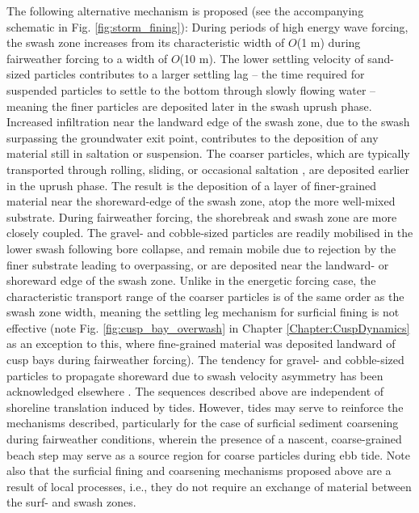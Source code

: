 The following alternative mechanism is proposed (see the accompanying schematic in Fig. \ref{fig:storm_fining}): During periods of high energy wave forcing, the swash zone increases from its characteristic width of $O$(1 m) during fairweather forcing to a width of $O$(10 m). The lower settling velocity of sand-sized particles contributes to a larger settling lag -- the time required for suspended particles to settle to the bottom through slowly flowing water \citep{Masselink_Puleo2006} -- meaning the finer particles are deposited later in the swash uprush phase. Increased infiltration near the landward edge of the swash zone, due to the swash surpassing the groundwater exit point, contributes to the deposition of any material still in saltation or suspension. The coarser particles, which are typically transported through rolling, sliding, or occasional saltation \citep{Carter_Orford1984}, are deposited earlier in the uprush phase. The result is the deposition of a layer of finer-grained material near the shoreward-edge of the swash zone, atop the more well-mixed substrate. During fairweather forcing, the shorebreak and swash zone are more closely coupled. The gravel- and cobble-sized particles are readily mobilised in the lower swash following bore collapse, and remain mobile due to rejection by the finer substrate leading to overpassing, or are deposited near the landward- or shoreward edge of the swash zone. Unlike in the energetic forcing case, the characteristic transport range of the coarser particles is of the same order as the swash zone width, meaning the settling leg mechanism for surficial fining is not effective (note Fig. \ref{fig:cusp_bay_overwash} in Chapter \ref{Chapter:CuspDynamics} as an exception to this, where fine-grained material was deposited landward of cusp bays during fairweather forcing). The tendency for gravel- and cobble-sized particles to propagate shoreward due to swash velocity asymmetry has been acknowledged elsewhere \citep{Carr1983}. The sequences described above are independent of shoreline translation induced by tides. However, tides may serve to reinforce the mechanisms described, particularly for the case of surficial sediment coarsening during fairweather conditions, wherein the presence of a nascent, coarse-grained beach step may serve as a source region for coarse particles during ebb tide. Note also that the surficial fining and coarsening mechanisms proposed above are a result of local processes, i.e., they do not require an exchange of material between the surf- and swash zones.


